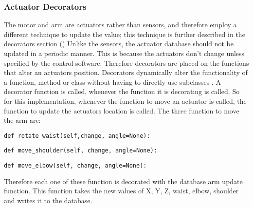 \subsubsection{Actuator Decorators}
The motor and arm are actuators rather than sensors, and therefore employ a different technique to update the value; this technique is further described in the decorators section (\cite{decoratordefinition})
\newline
Unlike the sensors, the actuator database should not be updated in a periodic manner. This is because the actuators don't change unless specified by the control software. Therefore decorators are placed on the functions that alter an actuators position.
\newline
Decorators dynamically alter the functionality of a function, method or class without having to directly use subclasses \cite{decoratordefinition}. A decorator function is called, whenever the function it is decorating is called. So for this implementation, whenever the function to move an actuator is called, the function to update the actuators location is called.
\newline
The three function to move the arm are:
\begin{lstlisting}[style=custompython]
def rotate_waist(self,change, angle=None):  
\end{lstlisting}
\begin{lstlisting}[style=custompython]
def move_shoulder(self, change, angle=None):  
\end{lstlisting}
\begin{lstlisting}[style=custompython]
def move_elbow(self, change, angle=None):  
\end{lstlisting}
Therefore each one of these function is decorated with the database arm update function. This function takes the new values of X, Y, Z, waist, elbow, shoulder and writes it to the database. 
\newline
